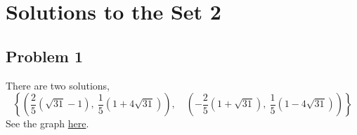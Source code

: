 \documentclass[12pt]{article}
\begin{document}
\section*{Solutions to the Set 2}
\subsection*{Problem 1}
There are two solutions,
\[
\left\{
\left( \frac{2}{5}\left(\sqrt{31}-1\right),\ \frac{1}{5}\left(1+4\sqrt{31}\right) \right),\quad
\left( -\frac{2}{5}\left(1+\sqrt{31}\right),\ \frac{1}{5}\left(1-4\sqrt{31}\right) \right)
\right\}
\]
See the graph \href{https://www.desmos.com/calculator/7hgg1unnb1}{here}.
\end{document}
